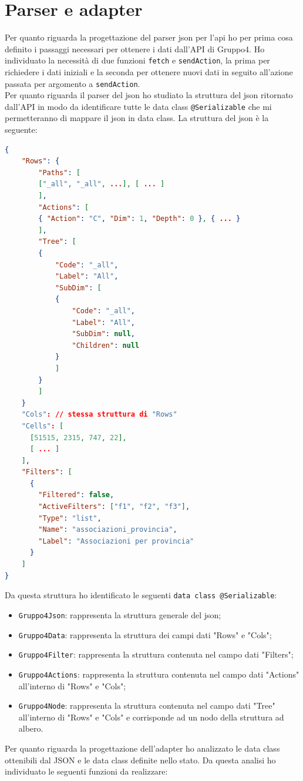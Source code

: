 \section{Parser e adapter}
Per quanto riguarda la progettazione del parser json per l'api ho per prima cosa definito i passaggi necessari per ottenere i dati dall'API di Gruppo4. Ho individuato la necessità di due funzioni \verb|fetch| e \verb|sendAction|, la prima per richiedere i dati iniziali e la seconda per ottenere nuovi dati in seguito all'azione passata per argomento a \verb|sendAction|. \\
Per quanto riguarda il parser del json ho studiato la struttura del json ritornato dall'API in modo da identificare tutte le data class \verb|@Serializable| che mi permetteranno di mappare il json in data class. La struttura del json è la seguente:
\begin{lstlisting}[caption={Struttura JSON API}, label={lst:bodycells}, language=json]
{
	"Rows": {
		"Paths": [
		["_all", "_all", ...], [ ... ]
		],
		"Actions": [
		{ "Action": "C", "Dim": 1, "Depth": 0 }, { ... }
		],
		"Tree": [
		{
			"Code": "_all",
			"Label": "All",
			"SubDim": [
			{
				"Code": "_all",
				"Label": "All",
				"SubDim": null,
				"Children": null
			}
			]  
		}
		]
	}
	"Cols": // stessa struttura di "Rows"
	"Cells": [
	  [51515, 2315, 747, 22],
	  [ ... ]
	],
	"Filters": [
	  {
	    "Filtered": false,
	    "ActiveFilters": ["f1", "f2", "f3"],
	    "Type": "list",
	    "Name": "associazioni_provincia",
	    "Label": "Associazioni per provincia"
	  }
	]
}
\end{lstlisting}
Da questa struttura ho identificato le seguenti \verb|data class @Serializable|:
\begin{itemize}
	\item \verb|Gruppo4Json|: rappresenta la struttura generale del json;
	\item \verb|Gruppo4Data|: rappresenta la struttura dei campi dati "Rows" e "Cols";
	\item \verb|Gruppo4Filter|: rappresenta la struttura contenuta nel campo dati "Filters";
	\item \verb|Gruppo4Actions|: rappresenta la struttura contenuta nel campo dati "Actions" all'interno di "Rows" e "Cols";
	\item \verb|Gruppo4Node|: rappresenta la struttura contenuta nel campo dati "Tree" all'interno di "Rows" e "Cols" e corrisponde ad un nodo della struttura ad albero.
\end{itemize}
\noindent
Per quanto riguarda la progettazione dell'adapter ho analizzato le data class ottenibili dal JSON e le data class definite nello stato. Da questa analisi ho individuato le seguenti funzioni da realizzare:
